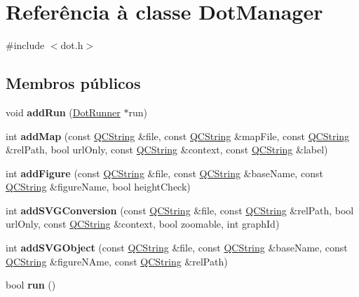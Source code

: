 \hypertarget{class_dot_manager}{\section{Referência à classe Dot\-Manager}
\label{class_dot_manager}
}


{\ttfamily \#include $<$dot.\-h$>$}

\subsection*{Membros públicos}
\begin{DoxyCompactItemize}
\item 
\hypertarget{class_dot_manager_aae22c9810950bac301e29a4bfc009fd4}{void {\bfseries add\-Run} (\hyperlink{class_dot_runner}{Dot\-Runner} $\ast$run)}\label{class_dot_manager_aae22c9810950bac301e29a4bfc009fd4}

\item 
\hypertarget{class_dot_manager_af3f933773f2704f55f97fa64d2809525}{int {\bfseries add\-Map} (const \hyperlink{class_q_c_string}{Q\-C\-String} \&file, const \hyperlink{class_q_c_string}{Q\-C\-String} \&map\-File, const \hyperlink{class_q_c_string}{Q\-C\-String} \&rel\-Path, bool url\-Only, const \hyperlink{class_q_c_string}{Q\-C\-String} \&context, const \hyperlink{class_q_c_string}{Q\-C\-String} \&label)}\label{class_dot_manager_af3f933773f2704f55f97fa64d2809525}

\item 
\hypertarget{class_dot_manager_afe8f0c8a63bf51b4157742942d8a1f97}{int {\bfseries add\-Figure} (const \hyperlink{class_q_c_string}{Q\-C\-String} \&file, const \hyperlink{class_q_c_string}{Q\-C\-String} \&base\-Name, const \hyperlink{class_q_c_string}{Q\-C\-String} \&figure\-Name, bool height\-Check)}\label{class_dot_manager_afe8f0c8a63bf51b4157742942d8a1f97}

\item 
\hypertarget{class_dot_manager_a9c7f05e7114508569578de2c0d73f436}{int {\bfseries add\-S\-V\-G\-Conversion} (const \hyperlink{class_q_c_string}{Q\-C\-String} \&file, const \hyperlink{class_q_c_string}{Q\-C\-String} \&rel\-Path, bool url\-Only, const \hyperlink{class_q_c_string}{Q\-C\-String} \&context, bool zoomable, int graph\-Id)}\label{class_dot_manager_a9c7f05e7114508569578de2c0d73f436}

\item 
\hypertarget{class_dot_manager_a6ebfc8523ad42ab342190851711b94cd}{int {\bfseries add\-S\-V\-G\-Object} (const \hyperlink{class_q_c_string}{Q\-C\-String} \&file, const \hyperlink{class_q_c_string}{Q\-C\-String} \&base\-Name, const \hyperlink{class_q_c_string}{Q\-C\-String} \&figure\-N\-Ame, const \hyperlink{class_q_c_string}{Q\-C\-String} \&rel\-Path)}\label{class_dot_manager_a6ebfc8523ad42ab342190851711b94cd}

\item 
\hypertarget{class_dot_manager_a149ad6701e3e2414cb566bb414029841}{bool {\bfseries run} ()}\label{class_dot_manager_a149ad6701e3e2414cb566bb414029841}

\end{DoxyCompactItemize}
